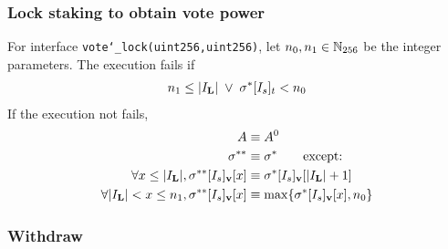 \subsubsection{Lock staking to obtain vote power}

For interface {\tt vote\char`_lock(uint256,uint256)}, let $n_0,n_1\in \mathbb{N}_{256}$ be the integer parameters. The execution fails if 
	\begin{align}
		n_1 \le  |I_\mathbf{L}| \;\vee\; \mathbf{\sigma}^*[I_s]_t<n_0
	\end{align}
	If the execution not fails, 
	\begin{align}
		A & \equiv A^0 \\
		\mathbf{\sigma}^{**} &\equiv \mathbf{\sigma}^* \qquad \mbox{except:}\\
		\forall x\le |I_\mathbf{L}|, \mathbf{\sigma}^{**}[I_s]_{\bf v}[x] &\equiv \mathbf{\sigma}^*[I_s]_{\bf v}[|I_\mathbf{L}|+1]\\ 
		\forall |I_\mathbf{L}|<x\le n_1, \mathbf{\sigma}^{**}[I_s]_{\bf v}[x] &\equiv \max\{\mathbf{\sigma}^*[I_s]_{\bf v}[x],n_0\}
    \end{align}
    
\subsubsection{Withdraw}

